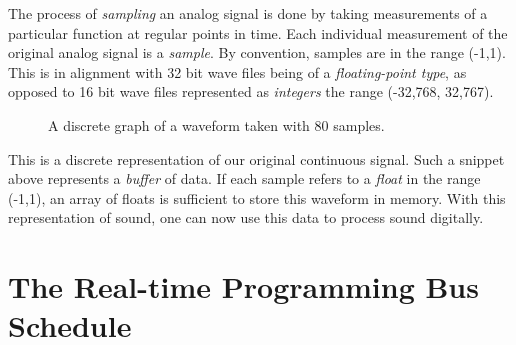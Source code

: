 The process of \textit{sampling} an analog signal is done by taking measurements of a particular function at regular points in time. Each individual measurement of the original analog signal is a \textit{sample}. By convention, samples are in the range (-1,1). This is in alignment with 32 bit wave files being of a \textit{floating-point type}, as opposed to 16 bit wave files represented as \textit{integers} the range (-32,768, 32,767).

\begin{figure}[h] %
	\begin{center}
		\caption{A discrete graph of a waveform taken with 80 samples.}
	\end{center}
\end{figure}

This is a discrete representation of our original continuous signal. Such a snippet above represents a \textit{buffer} of data. If each sample refers to a \textit{float} in the range (-1,1), an array of floats is sufficient to store this waveform in memory. With this representation of sound, one can now use this data to process sound digitally.

\section{The Real-time Programming Bus Schedule}\label{chap:two}

